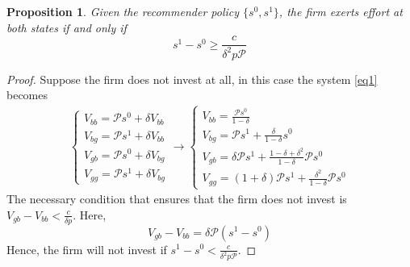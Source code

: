 \documentclass[a4paper]{article}
\newtheorem{proposition}[theorem]{Proposition}
\begin{document}
\begin{proposition}\label{prop1}
	Given the recommender policy $\{s^0, s^1\}$, the firm exerts effort at both states if and only if $$s^1 - s^0 \ge \frac{c}{\delta^2 p \mathcal{P}}$$
\end{proposition}
\begin{proof}
	Suppose the firm does not invest at all, in this case the system \eqref{eq1} becomes
	\begin{align*}
	\begin{cases}
	V_{bb} = \mathcal{P}s^0 + \delta V_{bb}\\
	V_{bg} = \mathcal{P}s^1 + \delta V_{bb}\\
	V_{gb} = \mathcal{P}s^0 + \delta V_{bg}\\
	V_{gg} = \mathcal{P}s^1 + \delta V_{bg}
	\end{cases} \to \begin{cases}
	V_{bb} = \frac{\mathcal{P}s^0}{1-\delta}\\
	V_{bg} = \mathcal{P}s^1 +\frac{\delta}{1-\delta}s^0\\
	V_{gb} = \delta \mathcal{P}s^1 + \frac{1-\delta + \delta^2}{1-\delta}\mathcal{P}s^0\\
	V_{gg} = (1+\delta)\mathcal{P}s^1 + \frac{\delta^2}{1-\delta}\mathcal{P}s^0
	\end{cases}
	\end{align*}
	The necessary condition that ensures that the firm does not invest is $	V_{gb} - V_{bb} < \frac{c}{\delta p}$. Here, $$	V_{gb} - V_{bb} = \delta \mathcal{P}(s^1 - s^0)$$ Hence, the firm will not invest if $s^1 - s^0 < \frac{c}{\delta^2 p \mathcal{P}}$.
	
	
	

\end{proof}
\end{document}
